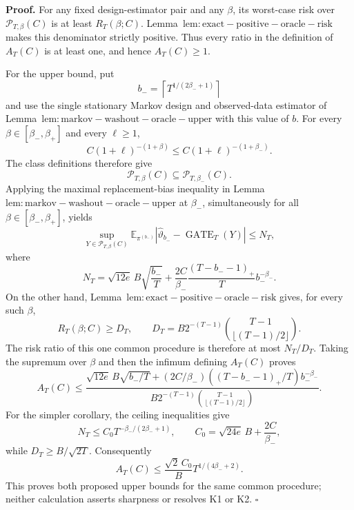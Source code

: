 \textbf{Proof.} For any fixed design-estimator pair and any \(\beta\), its worst-case risk over \(\mathcal P_{T,\beta}(C)\) is at least \(R_T(\beta;C)\). Lemma~\(\mathrm{lem:exact-positive-oracle-risk}\) makes this denominator strictly positive. Thus every ratio in the definition of \(A_T(C)\) is at least one, and hence \(A_T(C)\ge1\).

For the upper bound, put
\[
b_-=\left\lceil T^{1/(2\beta_-+1)}\right\rceil
\]
and use the single stationary Markov design and observed-data estimator of Lemma~\(\mathrm{lem:markov-washout-oracle-upper}\) with this value of \(b\). For every \(\beta\in[\beta_-,\beta_+]\) and every \(\ell\ge1\),
\[
C(1+\ell)^{-(1+\beta)}
\le C(1+\ell)^{-(1+\beta_-)}.
\]
The class definitions therefore give
\[
\mathcal P_{T,\beta}(C)\subseteq\mathcal P_{T,\beta_-}(C).
\]
Applying the maximal replacement-bias inequality in Lemma~\(\mathrm{lem:markov-washout-oracle-upper}\) at \(\beta_-\), simultaneously for all \(\beta\in[\beta_-,\beta_+]\), yields
\[
\sup_{Y\in\mathcal P_{T,\beta}(C)}
\mathbb E_{\pi^{(b_-)}}|\widehat\vartheta_{b_-}-\operatorname{GATE}_T(Y)|
\le N_T,
\]
where
\[
N_T=\sqrt{12e}\,B\sqrt{\frac{b_-}{T}}
+\frac{2C}{\beta_-}\frac{(T-b_--1)_+}{T}b_-^{-\beta_-}.
\]
On the other hand, Lemma~\(\mathrm{lem:exact-positive-oracle-risk}\) gives, for every such \(\beta\),
\[
R_T(\beta;C)\ge D_T,
\qquad
D_T=B2^{-(T-1)}\binom{T-1}{\lfloor(T-1)/2\rfloor}.
\]
The risk ratio of this one common procedure is therefore at most \(N_T/D_T\). Taking the supremum over \(\beta\) and then the infimum defining \(A_T(C)\) proves
\[
A_T(C)\le
\frac{\sqrt{12e}\,B\sqrt{b_-/T}+(2C/\beta_-)((T-b_--1)_+/T)b_-^{-\beta_-}}
{B2^{-(T-1)}\binom{T-1}{\lfloor(T-1)/2\rfloor}}.
\]
For the simpler corollary, the ceiling inequalities give
\[
N_T\le C_0T^{-\beta_-/(2\beta_-+1)},
\qquad
C_0=\sqrt{24e}\,B+\frac{2C}{\beta_-},
\]
while \(D_T\ge B/\sqrt{2T}\). Consequently
\[
A_T(C)
\le\frac{\sqrt2\,C_0}{B}T^{1/(4\beta_-+2)}.
\]
This proves both proposed upper bounds for the same common procedure; neither calculation asserts sharpness or resolves K1 or K2. \(\square\)